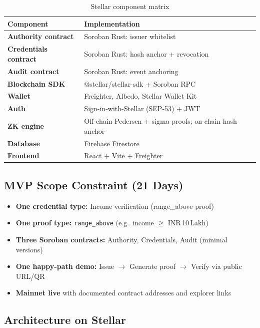 \documentclass[11pt,a4paper]{article}
\newcommand{\stellar}{\textsf{Stellar}}
\begin{document}
\begin{table}[H]
  \centering
  \caption{Stellar component matrix}
  \renewcommand{\arraystretch}{1.2}
  \small
  \begin{tabularx}{\textwidth}{@{}>{\bfseries}p{2.8cm} X@{}}
    \toprule
    Component & Implementation \\
    \midrule
    Authority contract & Soroban Rust: issuer whitelist \\
    Credentials contract & Soroban Rust: hash anchor + revocation \\
    Audit contract & Soroban Rust: event anchoring \\
    Blockchain SDK & @stellar/stellar-sdk + Soroban RPC \\
    Wallet & Freighter, Albedo, Stellar Wallet Kit \\
    Auth & Sign-in-with-Stellar (SEP-53) + JWT \\
    ZK engine & Off-chain Pedersen + sigma proofs; on-chain hash anchor \\
    Database & Firebase Firestore \\
    Frontend & React + Vite + Freighter \\
    \bottomrule
  \end{tabularx}
\end{table}

\subsection{MVP Scope Constraint (21 Days)}

\begin{keybox}
  \begin{itemize}
    \item \textbf{One credential type:} Income verification (range\_above proof)
    \item \textbf{One proof type:} \texttt{range\_above} (e.g.\ income $\geq$ INR\,10\,Lakh)
    \item \textbf{Three Soroban contracts:} Authority, Credentials, Audit (minimal versions)
    \item \textbf{One happy-path demo:} Issue $\rightarrow$ Generate proof $\rightarrow$ Verify via public URL/QR
    \item \textbf{Mainnet live} with documented contract addresses and explorer links
  \end{itemize}
\end{keybox}

\subsection{Architecture on \stellar{}}
\end{document}
